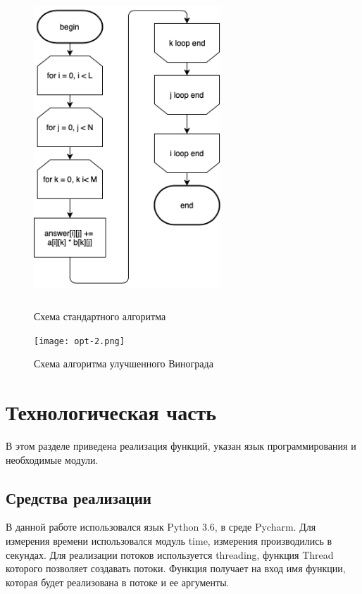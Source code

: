 \documentclass[12pt]{article}
\begin{document}
\begin{figure}[ht!]
	\centering
	\includegraphics[width=70mm, height=120mm]{multiply.png}
	\caption{Схема стандартного алгоритма\label{overflow}}
\end{figure}
\newpage
\newpage
\begin{figure}[ht!]
	\centering
	\texttt{[image: opt-2.png]}
	\caption{Схема алгоритма улучшенного Винограда \label{overflow}}
\end{figure}

\newpage
\newpage

\section{Технологическая часть}

В этом разделе приведена реализация функций, указан язык программирования и необходимые модули. 
\subsection{Средства реализации}
В данной работе использовался язык Python 3.6, в среде Pycharm. Для измерения времени использовался модуль time, измерения производились в секундах.
Для реализации потоков используется threading, функция Thread которого позволяет создавать потоки. Функция получает на вход имя функции, которая будет реализована в потоке и ее аргументы. 
\end{document}
